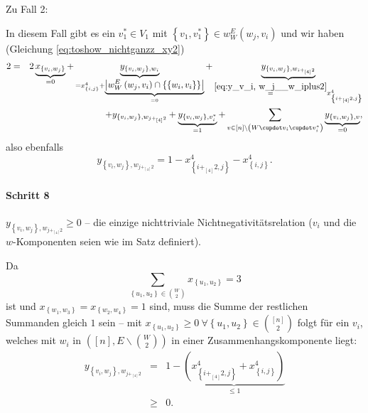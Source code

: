 \documentclass[10p,a4paper,BCOR = 12mm, DIV=15]{scrbook}
\begin{document}
{\begin{bew}
Zu Fall 2:

In diesem Fall gibt es ein $v_1^* \in V_1$ mit $\left\{v_1, v_1^*\right\} \in w_W^E\left(w_j, v_i\right)$ und wir haben (Gleichung \eqref{eq:toshow_nichtganzz_xy2})
\begin{eqnarray*}
2 & = & 2 \underbrace{x_{\left\{v_i, w_j\right\}}}_{= 0} + \underbrace{y_{\left\{v_i, w_j\right\}, w_i}}_{= x^{4}_{\left\{i, j\right\}} + \underbrace{\left|w_W^E\left(w_j, v_i\right) \cap \left\{\left\{w_i, v_i\right\}\right\}\right|}_{= 0}} + \underbrace{y_{\left\{v_i, w_j\right\}, w_{i +_{\left[4\right]} 2}}}_{\stackrel{\eqref{eq:y_v_i, w_j__w_iplus2}}{=} x^{4}_{\left\{i+_{\left[4\right]} 2, j\right\}}} \\
& & + y_{\left\{v_i, w_j\right\}, w_{j +_{\left[4\right]} 2}} + \underbrace{y_{\left\{v_i, w_j\right\}, v_i^*}}_{= 1} + \sum_{v \in \left[n\right] \backslash \left(W \cupdot v_i \cupdot v_i^*\right)} \underbrace{y_{\left\{v_i, w_j\right\}, v}}_{= 0},
\end{eqnarray*}
also ebenfalls
\begin{displaymath}
y_{\left\{v_i, w_j\right\}, w_{j +_{\left[4\right]} 2}} = 1 - x^{4}_{\left\{i+_{\left[4\right]} 2, j\right\}} - x^{4}_{\left\{i, j\right\}}.
\end{displaymath}

\paragraph{Schritt 8} $y_{\left\{v_i, w_j\right\}, w_{j +_{\left[4\right]} 2}} \geq 0$ -- die einzige nichttriviale Nichtnegativitätsrelation ($v_i$ und die $w$-Komponenten seien wie im Satz definiert).

Da
\begin{displaymath}
\sum_{\left\{u_1, u_2\right\} \in {W \choose 2}} x_{\left\{u_1, u_2\right\}} = 3
\end{displaymath}
ist und $x_{\left\{w_1, w_3\right\}} = x_{\left\{w_2, w_4\right\}} = 1$ sind, muss die Summe der restlichen Summanden gleich $1$ sein -- mit $x_{\left\{u_1, u_2\right\}} \geq 0 \ \forall \left\{u_1, u_2\right\} \in {\left[n\right] \choose 2}$ folgt für ein $v_i$, welches mit $w_i$ in $\left(\left[n\right], E \backslash {W \choose 2}\right)$ in einer Zusammenhangskomponente liegt:
\begin{eqnarray*}
y_{\left\{v_i, w_j\right\}, w_{j +_{\left[4\right]} 2}} & = & 1 - \underbrace{\left( x^{4}_{\left\{i+_{\left[4\right]} 2, j\right\}} 
+ x^{4}_{\left\{i, j\right\}}\right)}_{\leq 1} \\
& \geq & 0.
\end{eqnarray*}


\end{bew}}
\end{document}
